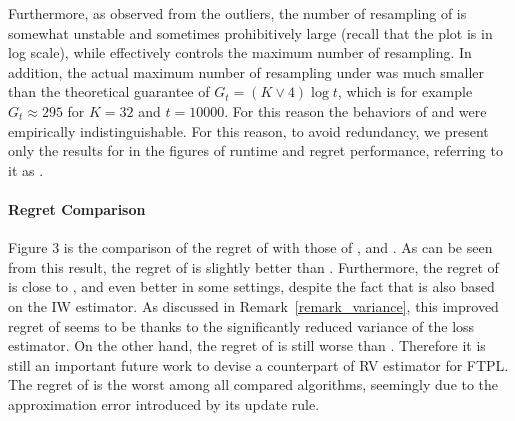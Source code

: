Furthermore, as observed from the outliers, the number of resampling of {} is somewhat unstable and sometimes
prohibitively large (recall that the plot is in log scale),
while {} effectively controls the maximum number of resampling.
In addition, the actual maximum number of resampling under {}
was much smaller than the theoretical guarantee of
$G_t=(K\lor 4)\log t$, which is for example $G_t\approx 295$ for $K=32$ and $t=10000$.
For this reason the behaviors of {} and {} were empirically indistinguishable.
For this reason, to avoid redundancy, we present only the results for {} in the figures of runtime and regret performance, referring to it as {}.






\paragraph{Regret Comparison}
Figure 3 is the comparison of the regret of {} with those of {}, {} and {}. 
As can be seen from this result, the regret of {} is slightly better than {}.
Furthermore, the regret of {} is close to {}, and even better in some settings,
despite the fact that {} is also based on the IW estimator.
As discussed in Remark~\ref{remark_variance},
this improved regret of {} seems to be thanks to the significantly reduced variance of the loss estimator.
On the other hand, the regret of {} is still worse than {}.
Therefore it is still an important future work to devise a counterpart of RV estimator for FTPL.
The regret of {} is the worst among all compared algorithms, seemingly due to the approximation error introduced by its update rule.


